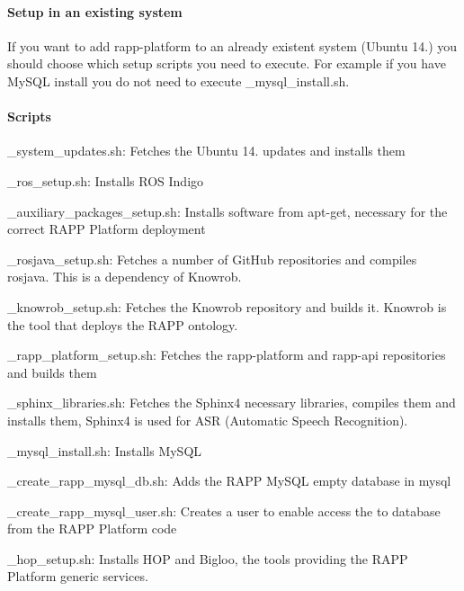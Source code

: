 \paragraph*{Setup in an existing system}

If you want to add rapp-\/platform to an already existent system (Ubuntu 14.) you should choose which setup scripts you need to execute. For example if you have My\-S\-Q\-L install you do not need to execute {\-\_\-mysql\-\_\-install.\-sh}.

\paragraph*{Scripts}


\begin{DoxyItemize}
\item {\-\_\-system\-\_\-updates.\-sh}\-: Fetches the Ubuntu 14. updates and installs them
\item {\-\_\-ros\-\_\-setup.\-sh}\-: Installs R\-O\-S Indigo
\item {\-\_\-auxiliary\-\_\-packages\-\_\-setup.\-sh}\-: Installs software from apt-\/get, necessary for the correct R\-A\-P\-P Platform deployment
\item {\-\_\-rosjava\-\_\-setup.\-sh}\-: Fetches a number of Git\-Hub repositories and compiles rosjava. This is a dependency of Knowrob.
\item {\-\_\-knowrob\-\_\-setup.\-sh}\-: Fetches the Knowrob repository and builds it. Knowrob is the tool that deploys the R\-A\-P\-P ontology.
\item {\-\_\-rapp\-\_\-platform\-\_\-setup.\-sh}\-: Fetches the rapp-\/platform and rapp-\/api repositories and builds them
\item {\-\_\-sphinx\-\_\-libraries.\-sh}\-: Fetches the Sphinx4 necessary libraries, compiles them and installs them, Sphinx4 is used for A\-S\-R (Automatic Speech Recognition).
\item {\-\_\-mysql\-\_\-install.\-sh}\-: Installs My\-S\-Q\-L
\item {\-\_\-create\-\_\-rapp\-\_\-mysql\-\_\-db.\-sh}\-: Adds the R\-A\-P\-P My\-S\-Q\-L empty database in mysql
\item {\-\_\-create\-\_\-rapp\-\_\-mysql\-\_\-user.\-sh}\-: Creates a user to enable access the to database from the R\-A\-P\-P Platform code
\item {\-\_\-hop\-\_\-setup.\-sh}\-: Installs H\-O\-P and Bigloo, the tools providing the R\-A\-P\-P Platform generic services.
\end{DoxyItemize}

